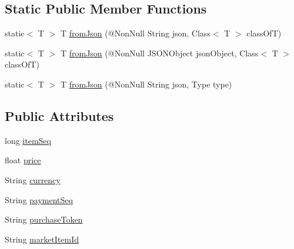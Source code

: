 \subsection*{Static Public Member Functions}
\begin{DoxyCompactItemize}
\item 
static$<$ T $>$ T \hyperlink{classcom_1_1toast_1_1android_1_1gamebase_1_1base_1_1_value_object_ae6655c88c20a9a8406dc11b46250ac7b}{from\+Json} (@Non\+Null String json, Class$<$ T $>$ class\+OfT)
\item 
static$<$ T $>$ T \hyperlink{classcom_1_1toast_1_1android_1_1gamebase_1_1base_1_1_value_object_ab83c4196ee2e3f11553bbe0f04dc2101}{from\+Json} (@Non\+Null J\+S\+O\+N\+Object json\+Object, Class$<$ T $>$ class\+OfT)
\item 
static$<$ T $>$ T \hyperlink{classcom_1_1toast_1_1android_1_1gamebase_1_1base_1_1_value_object_aa901d97d495150b54bcb80c05672f58a}{from\+Json} (@Non\+Null String json, Type type)
\end{DoxyCompactItemize}
\subsection*{Public Attributes}
\begin{DoxyCompactItemize}
\item 
long \hyperlink{classcom_1_1toast_1_1android_1_1gamebase_1_1base_1_1purchase_1_1_purchasable_receipt_ae238e7a4dbb904519cb83075b2ac046f}{item\+Seq}
\item 
float \hyperlink{classcom_1_1toast_1_1android_1_1gamebase_1_1base_1_1purchase_1_1_purchasable_receipt_a500426aec97889b7572f25ae45c06a8d}{price}
\item 
String \hyperlink{classcom_1_1toast_1_1android_1_1gamebase_1_1base_1_1purchase_1_1_purchasable_receipt_a21ef1fb8b40391856719451100a37a00}{currency}
\item 
String \hyperlink{classcom_1_1toast_1_1android_1_1gamebase_1_1base_1_1purchase_1_1_purchasable_receipt_aa036458576ad15900867e41ef43fc1df}{payment\+Seq}
\item 
String \hyperlink{classcom_1_1toast_1_1android_1_1gamebase_1_1base_1_1purchase_1_1_purchasable_receipt_a62d63205b7e00bdaf4601675392d24ae}{purchase\+Token}
\item 
String \hyperlink{classcom_1_1toast_1_1android_1_1gamebase_1_1base_1_1purchase_1_1_purchasable_receipt_a5d29b8e8b35b651ac8ec048046b800c3}{market\+Item\+Id}
\end{DoxyCompactItemize}


